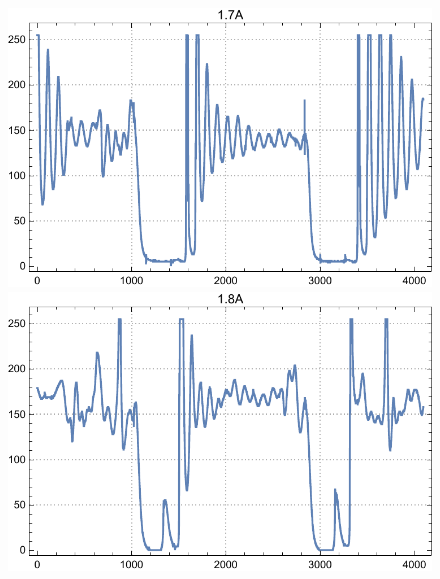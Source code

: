 \documentclass[a4paper, 12pt]{article}
\begin{document}
\begin{enumerate}
\begin{figure}[h]
			\endminipage\hfill
			\includegraphics[width=\linewidth]{1.7A.pdf}
			\endminipage\hfill
			\includegraphics[width=\linewidth]{1.8A.pdf}
			\endminipage
		\end{figure}
		\par
	\end{enumerate}
	\newpage
\end{document}

